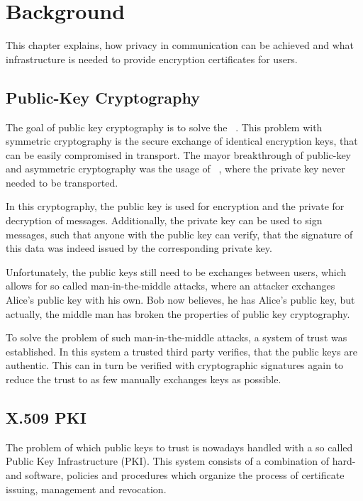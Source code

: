 \chapter{Background}\label{ch:publicKeyInfrastructure}

This chapter explains, how privacy in communication can be achieved and what infrastructure is needed to provide
encryption certificates for users.

\section{Public-Key Cryptography}\label{sec:publicKeyCryptography}
The goal of public key cryptography is to solve the ~\cite{diffie1976new}.
This problem with symmetric cryptography is the secure exchange of identical encryption keys, that can be easily
compromised in transport.
The mayor breakthrough of public-key and asymmetric cryptography was the usage of ~\cite{schneier2007applied}, where the private key never needed to be transported.

In this cryptography, the public key is used for encryption and the private for decryption of messages.
Additionally, the private key can be used to sign messages, such that anyone with the public key can verify, that the
signature of this data was indeed issued by the corresponding private key.

Unfortunately, the public keys still need to be exchanges between users, which allows for so called man-in-the-middle
attacks, where an attacker exchanges Alice's public key with his own.
Bob now believes, he has Alice's public key, but actually, the middle man has broken the properties of public key
cryptography.

To solve the problem of such man-in-the-middle attacks, a system of trust was established.
In this system a trusted third party verifies, that the public keys are authentic.
This can in turn be verified with cryptographic signatures again to reduce the trust to as few manually exchanges keys
as possible.

\section{X.509 PKI}\label{sec:publicKeyInfrastructure}
The problem of which public keys to trust is nowadays handled with a so called Public Key Infrastructure (PKI).
This system consists of a combination of hard- and software, policies and procedures which organize the process of
certificate issuing, management and revocation.

